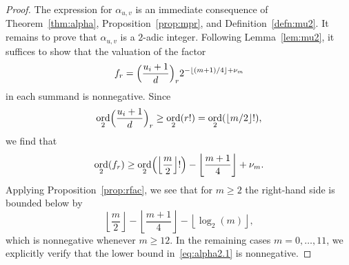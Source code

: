 \documentclass[a4paper,11pt]{article}
\numberwithin{equation}{section}
\providecommand{\floor}[1]{\left\lfloor#1\right\rfloor}   %
\DeclareMathOperator{\ord}{ord}          %
\theoremstyle{definition}
\newtheorem{rem}[thm]{Remark}
\begin{document}
\begin{proof}
The expression for $\alpha_{u,v}$ is an immediate consequence 
of Theorem~\ref{thm:alpha}, Proposition~\ref{prop:mpr}, and 
Definition~\ref{defn:mu2}. It remains to prove that 
$\alpha_{u,v}$ is a $2$-adic integer.  Following Lemma~\ref{lem:mu2}, 
it suffices to show that the valuation of the factor 
\begin{equation} \label{eq:fr}
f_r=\Bigl(\frac{u_i+1}{d}\Bigr)_r 2^{- \floor{(m+1)/4} + \nu_m}
\end{equation}
in each summand is nonnegative. Since
\[
\ord_{2} \Bigl(\frac{u_i+1}{d}\Bigr)_r \geq \ord_{2}(r!) = \ord_{2}(\floor{m/2}!),
\] 
we find that 
\begin{equation} \label{eq:alpha2.1}
\ord_{2}(f_r)
\geq \ord_{2} \Bigl(\floor{\frac{m}{2}}!\Bigr) - \floor{\frac{m+1}{4}} + \nu_m.
\end{equation}
Applying Proposition~\ref{prop:rfac}, we see that for $m \geq 2$ the 
right-hand side is bounded below by 
\begin{equation*}
\floor{\frac{m}{2}} - \floor{\frac{m+1}{4}} - \floor{\log_2(m)},
\end{equation*}
which is nonnegative whenever $m \geq 12$.  In the remaining 
cases $m = 0, \dotsc, 11$, we explicitly verify that the 
lower bound in~\eqref{eq:alpha2.1} is nonnegative.
\end{proof}

\begin{comment}
\begin{rem}
We observe that in Theorem~\ref{thm:alpha2} the exponent 
$-\floor{(m+1)/4}+\nu_m$ is nonpositive for each value $m \geq 0$, 
so at first sight it seems that the computation of the $f_r$ from
\eqref{eq:fr} will suffer from precision loss. 
However, we recall that $m = m(0) + 2r$, $m(0) \in \{0,1\}$, and noting that 
$d$ is odd let $g_r = d^r f_r$ and $z = u_i + 1$ to temporarily simplify 
our notation.  We now see that the sequence satisfies 
\begin{align*}
g_0 & = 1, \\
g_1 & = z, \\
g_5 & = 2^{-2-m(0)} \bigl( z (z + d) (z + 2d) (z + 3d) (z + 4d) \bigr) \\
g_r & = g_{r-2} \frac{(z + (r - 2)d)(z + (r - 1)d)}{2}
\end{align*}
for all remaining $r \geq 0$.  Since the numerator is an even integer, 
it follows that this computation can be carried out without precision loss.
\end{rem}
\end{comment}
\end{document}

